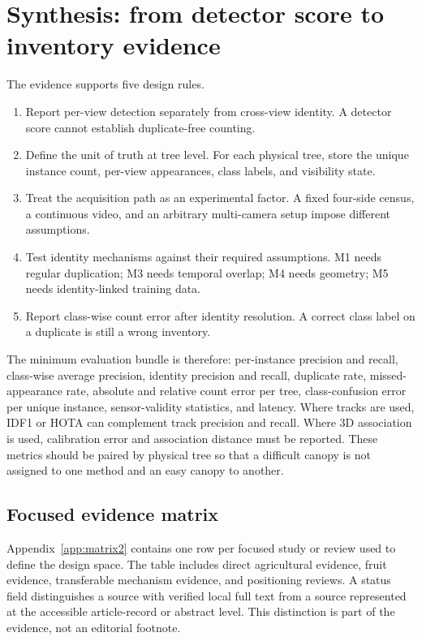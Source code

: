 \section{Synthesis: from detector score to inventory evidence}
\label{sec:synthesis2}

The evidence supports five design rules.

\begin{enumerate}[leftmargin=*,itemsep=2pt]
  \item Report per-view detection separately from cross-view identity. A detector score cannot establish duplicate-free counting.
  \item Define the unit of truth at tree level. For each physical tree, store the unique instance count, per-view appearances, class labels, and visibility state.
  \item Treat the acquisition path as an experimental factor. A fixed four-side census, a continuous video, and an arbitrary multi-camera setup impose different assumptions.
  \item Test identity mechanisms against their required assumptions. M1 needs regular duplication; M3 needs temporal overlap; M4 needs geometry; M5 needs identity-linked training data.
  \item Report class-wise count error after identity resolution. A correct class label on a duplicate is still a wrong inventory.
\end{enumerate}

The minimum evaluation bundle is therefore: per-instance precision and recall, class-wise average precision, identity precision and recall, duplicate rate, missed-appearance rate, absolute and relative count error per tree, class-confusion error per unique instance, sensor-validity statistics, and latency. Where tracks are used, IDF1 or HOTA can complement track precision and recall. Where 3D association is used, calibration error and association distance must be reported. These metrics should be paired by physical tree so that a difficult canopy is not assigned to one method and an easy canopy to another.

\subsection{Focused evidence matrix}

Appendix~\ref{app:matrix2} contains one row per focused study or review used to define the design space. The table includes direct agricultural evidence, fruit evidence, transferable mechanism evidence, and positioning reviews. A status field distinguishes a source with verified local full text from a source represented at the accessible article-record or abstract level. This distinction is part of the evidence, not an editorial footnote.

